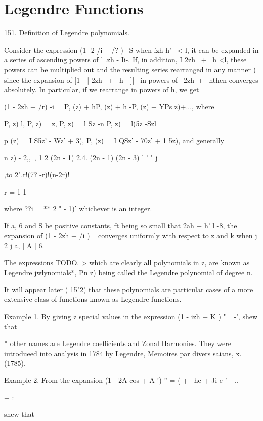 \chapter{Legendre Functions} 

151. Definition of Legendre polynomials.

Consider the expression (1 -2 /i -|-/? )~ S when \'izh-h' \ < l, it
can be expanded in a series of ascending powers of ' .zh - Ii-. If, in
addition, I 2zh \ + \ h <l, these powers can be multiplied out and the
resulting series rearranged in any manner ) since the expansion
of [1 - | 2zh \ + \ h\ \ ]]~ in powers of \ 2zh\ + \ h\' then
converges absolutely. In particular, if we rearrange in powers of h,
we get

(1 - 2zh + /r) -i = P, (z) + hP, (z) + h -P, (z) + ¥Ps z)+..., where

P, z) l, P, z) = z, P, z) = l Sz -n P, z) = l(5z -Szl

p (z) = I S5z' - Wz' + 3), P, (z) = I QSz' - 70z' + 1 5z), and
generally

 n z) - 2,, \,, 1 2 (2n - 1) 2.4. (2n - 1) (2n - 3) ' ' " j

,to 2".r!(7? -r)!(n-2r)!

r = 1 1

where ??i = ** 2 " - 1)' whichever is an integer.

If a, 6 and S be positive constants, ft being so small that 2ah + h' l
-8, the expansion of (1 - 2zh + /i ) ~ converges uniformly with
respect to z and k when j 2 j a, | A | 6.

The expressions TODO.    > which are clearly all
polynomials in z, are known as Legendre jwlynomials*, Pn z) being
called the Legendre polynomial of degree n.

It will appear later ( 15"2) that these polynomials are particular
cases of a more extensive class of functions known as Legendre
functions.

Example 1. By giving z special values in the expression (1 - izh + K )
" =-', shew that

* other names are Legendre coefficients and Zonal Harmonies. They were
iutrodueed into analysis in 1784 by Legendre, Memoires par divers
saians, x. (1785).

%
%

Example 2. From the expansion (1 - 2A cos + A ') '' = ( + \ he + Ji-e
' +..\

+ :

shew that

